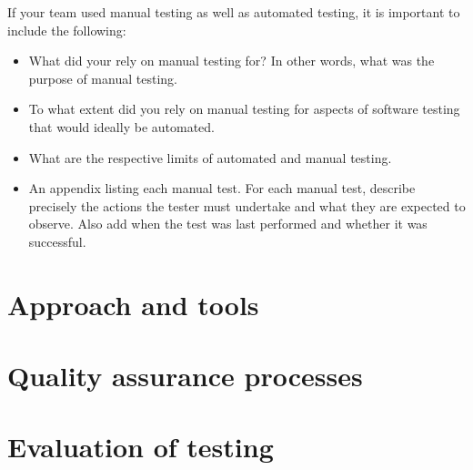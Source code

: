 \begin{expectations}
If your team used manual testing as well as automated testing, it is important to include the following:
\begin{itemize}
\item What did your rely on manual testing for?  In other words, what was the purpose of manual testing.
\item To what extent did you rely on manual testing for aspects of software testing that would ideally be automated.
\item What are the respective limits of automated and manual testing.
\item An appendix listing each manual test.  For each manual test, describe precisely the actions the tester must undertake and what they are expected to observe.  Also add when the test was last performed and whether it was successful.
\end{itemize}
\end{expectations}

\section{Approach and tools}
\label{sect:testing:approach}

\section{Quality assurance processes}
\label{sect:testing:process}

\section{Evaluation of testing}
\label{sect:testing:evaluation}